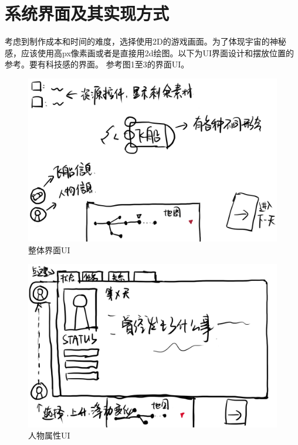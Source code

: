 \documentclass{ctexart}
\begin{document}
			\section{系统界面及其实现方式}
		考虑到制作成本和时间的难度，选择使用2D的游戏画面。为了体现宇宙的神秘感，应该使用高px像素画或者是直接用2d绘图。以下为UI界面设计和摆放位置的参考。要有科技感的界面。
		参考图1至3的界面UI。
		\begin{figure}[H]
			\centering
			\includegraphics[scale=0.2]{material/整体界面UI.png}
			\caption{整体界面UI}
			\label{整体界面UI}
		\end{figure}
		
		\begin{figure}[H]
			\centering
			\includegraphics[scale=0.2]{material/人物属性UI.png}
			\caption{人物属性UI}
			\label{人物属性UI}
		\end{figure}
		
\end{document}
